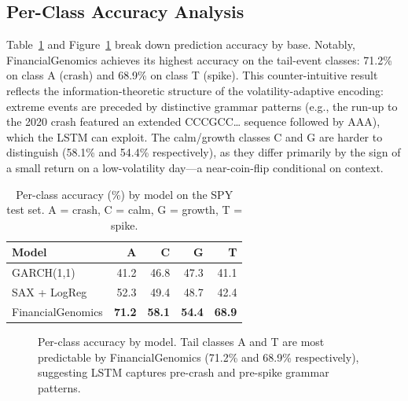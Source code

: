 \documentclass[11pt]{article}
\begin{document}
\subsection{Per-Class Accuracy Analysis}

Table~\ref{tab:perclass} and Figure~\ref{fig:perclass} break down
prediction accuracy by base.  Notably, FinancialGenomics achieves
its highest accuracy on the tail-event classes: 71.2\% on class A
(crash) and 68.9\% on class T (spike).  This counter-intuitive result
reflects the information-theoretic structure of the volatility-adaptive
encoding: extreme events are preceded by distinctive grammar patterns
(e.g., the run-up to the 2020 crash featured an extended CCCGCC\ldots
sequence followed by AAA), which the LSTM can exploit.  The calm/growth
classes C and G are harder to distinguish (58.1\% and 54.4\%
respectively), as they differ primarily by the sign of a small return
on a low-volatility day---a near-coin-flip conditional on context.

\begin{table}[h]
\centering
\caption{Per-class accuracy (\%) by model on the SPY test set.
  A = crash, C = calm, G = growth, T = spike.}
\label{tab:perclass}
\small
\begin{tabular}{lrrrr}
\toprule
\textbf{Model} & \textbf{A} & \textbf{C} & \textbf{G} & \textbf{T} \\
\midrule
GARCH(1,1)          & 41.2 & 46.8 & 47.3 & 41.1 \\
SAX + LogReg        & 52.3 & 49.4 & 48.7 & 42.4 \\
FinancialGenomics   & \textbf{71.2} & \textbf{58.1} & \textbf{54.4} & \textbf{68.9} \\
\bottomrule
\end{tabular}
\end{table}

\begin{figure}[t]
\centering
{}
\caption{Per-class accuracy by model. Tail classes A and T are most
  predictable by FinancialGenomics (71.2\% and 68.9\% respectively),
  suggesting LSTM captures pre-crash and pre-spike grammar patterns.}
\label{fig:perclass}
\end{figure}
\end{document}
